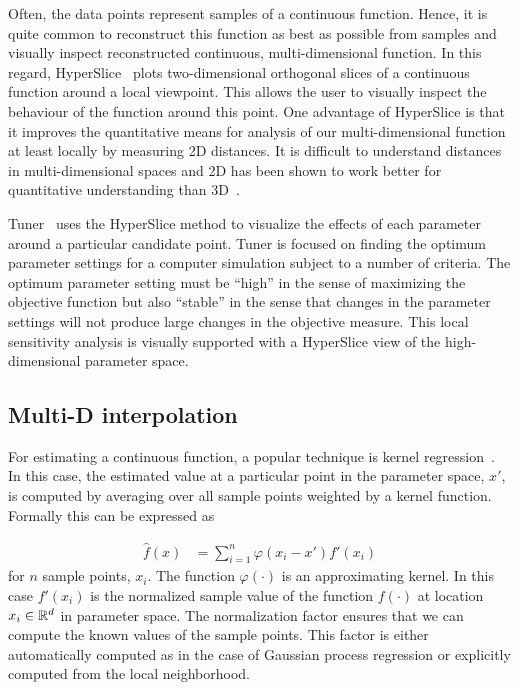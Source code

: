 Often, the data points represent samples of a continuous function. Hence, it
is quite common to reconstruct this function as best as possible from samples
and visually inspect reconstructed continuous, multi-dimensional function.
In this regard, HyperSlice~\cite{Wijk:1993} plots
two-dimensional orthogonal slices of a continuous function around a local
viewpoint. This allows the user to visually inspect the behaviour of the
function around this point. One advantage of HyperSlice is that it improves
the quantitative means for analysis of our multi-dimensional function at 
least locally
by measuring 2D distances. It is difficult to understand distances in
multi-dimensional spaces and 2D has been shown to work better for quantitative
understanding than 3D~\cite{Tory:2006}.

Tuner~\cite{Torsney-Weir:2011} uses the HyperSlice method to
visualize the effects of each parameter around a particular candidate point.
Tuner is focused on finding the optimum parameter settings for a computer
simulation subject to a number of criteria. The optimum parameter setting must
be ``high'' in the sense of maximizing the objective function but also
``stable'' in the sense that changes in the parameter settings will not
produce large changes in the objective measure. This local sensitivity
analysis is visually supported with a HyperSlice view of the high-dimensional
parameter space.

\subsection{Multi-D interpolation}
\label{multi-dinterpolation}

For estimating a continuous function, a popular technique is 
kernel regression~\cite{Simonoff:1996}. In this case, the estimated value at a
particular point in the parameter space, $x'$, is computed by averaging over
all sample points weighted by a kernel function. Formally this can be
expressed as

\begin{align}
 \hat{f}(x) &= \sum_{i=1}^n \varphi(x_i -x') f'(x_i)
 \label{eq:kernel_regression}
\end{align}
for $n$ sample points, $x_i$. The function $\varphi(\cdot)$ is an approximating
kernel. In this case $f'(x_i)$ is the normalized sample value 
of the function $f(\cdot)$ at 
location $x_i \in \mathbb{R}^d$
in parameter space. The normalization factor ensures that we can
compute the known values of the sample points.
This factor is either automatically 
computed as in the case of Gaussian process regression or explicitly computed 
from the local neighborhood. 

